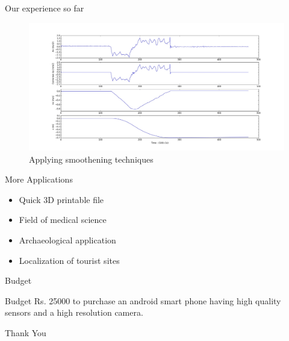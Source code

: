 \documentclass{beamer}
\begin{document}
\begin{frame}{Our experience so far}{}
\end{frame}

\begin{frame}{}{}
  \begin{figure}[ht!]
    \centering
    \includegraphics[width=\linewidth]{Corrected.jpeg}
    \caption{Applying smoothening techniques}
  \end{figure}
  \note{\textcolor{red}{Kartikeya\\}}
\end{frame}

\begin{frame}{More Applications}{}
  \begin{itemize}
    \item Quick 3D printable file
    \item Field of medical science
    \item Archaeological application
    \item Localization of tourist sites
  \end{itemize}
  \note{\textcolor{green}{Prateek\\}}
\end{frame}

\begin{frame}{Budget}{}
\begin{block}{Budget}
Rs. 25000 to purchase an android smart phone having high quality sensors and a high resolution camera.
\end{block}
  \note{\textcolor{red}{Kartikeya\\}}
\end{frame}


\begin{frame}
\vfill
\begin{center}
\huge{Thank You}
\end{center}
\vfill
{}
\end{frame}
\end{document}
